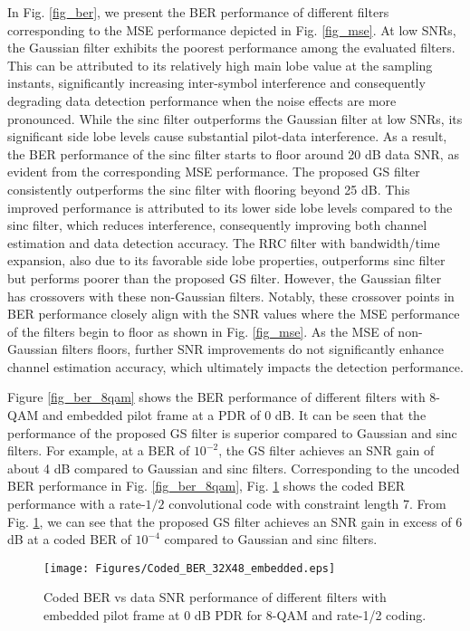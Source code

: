 In Fig. \ref{fig_ber}, we present the BER performance of different filters corresponding to the MSE performance depicted in Fig. \ref{fig_mse}. At low SNRs, the Gaussian filter exhibits the poorest performance among the evaluated filters. This can be attributed to its relatively high main lobe value at the sampling instants, significantly increasing inter-symbol interference and consequently degrading data detection performance when the noise effects are more pronounced. While the sinc filter outperforms the Gaussian filter at low SNRs, its significant side lobe levels cause substantial pilot-data interference. As a result, the BER performance of the sinc filter starts to floor around 20 dB data SNR, as evident from the corresponding MSE performance. The proposed GS filter consistently outperforms the sinc filter with flooring beyond 25 dB. This improved performance is attributed to its lower side lobe levels compared to the sinc filter, which reduces interference, consequently improving both channel estimation and data detection accuracy. The RRC filter with bandwidth/time expansion, also due to its favorable side lobe properties, outperforms sinc filter but performs poorer than the proposed GS filter. However, the Gaussian filter has crossovers with these non-Gaussian filters. Notably, these crossover points in BER performance closely align with the SNR values where the MSE performance of the filters begin to floor as shown in Fig. \ref{fig_mse}. As the MSE of non-Gaussian filters floors, further SNR improvements do not significantly enhance channel estimation accuracy, which ultimately impacts the detection performance.

Figure \ref{fig_ber_8qam} shows the BER performance of different filters with 8-QAM and embedded pilot frame at a PDR of 0 dB. It can be seen that the performance of the proposed GS filter is superior compared to Gaussian and sinc filters. For example, at a BER of $10^{-2}$, the GS filter achieves an SNR gain of about 4 dB compared to Gaussian and sinc filters. Corresponding to the uncoded BER performance in Fig. \ref{fig_ber_8qam}, Fig. \ref{fig_ber_8qam_coded} shows the coded BER performance with a rate-$1/2$ convolutional code with constraint length 7. From Fig. \ref{fig_ber_8qam_coded}, we can see that the proposed GS filter achieves an SNR gain in excess of 6 dB at a coded BER of $10^{-4}$ compared to Gaussian and sinc filters.

\begin{figure}[!t]
\centering
\texttt{[image: Figures/Coded\_BER\_32X48\_embedded.eps]}
\caption{Coded BER vs data SNR performance of different filters with embedded pilot frame at 0 dB PDR for 8-QAM and rate-1/2 coding.}
\label{fig_ber_8qam_coded}
\vspace{-7mm}
\end{figure}
